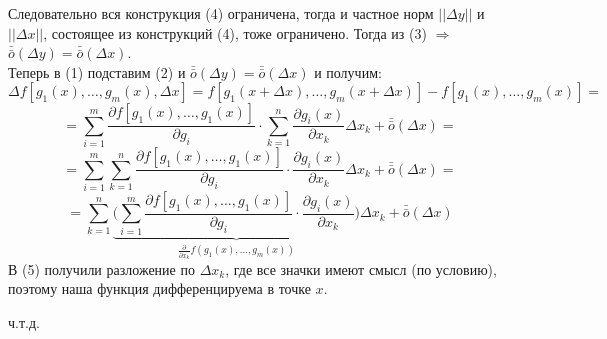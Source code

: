 \documentclass[book, 11pt]{report}
\begin{document}
{        Следовательно вся конструкция (4) ограничена, тогда и частное норм $||\Delta y||$ и $||\Delta x||$, состоящее из конструкций (4), тоже ограничено. Тогда из (3) $\Rightarrow$ $\bar{\bar{o}}(\Delta y)=\bar{\bar{o}}(\Delta x)$.\\
        Теперь в (1) подставим (2) и $\bar{\bar{o}}(\Delta y)=\bar{\bar{o}}(\Delta x)$ и получим:
        \begin{equation*}
            \Delta f[g_1(x),\ldots,g_m(x), \Delta x]=f[g_1(x+\Delta x),\ldots,g_m(x+\Delta x)]-f[g_1(x),\ldots,g_m(x)]=
        \end{equation*}
        \begin{equation*}
            =\sum_{i=1}^m\frac{\partial f[g_1(x),\ldots,g_1(x)]}{\partial g_i}\cdot\sum_{k=1}^n\frac{\partial g_i(x)}{\partial x_k}\Delta x_k+\bar{\bar{o}}(\Delta x)=
        \end{equation*}
        \begin{equation*}
            =\sum_{i=1}^m\sum_{k=1}^n\frac{\partial f[g_1(x),\ldots,g_1(x)]}{\partial g_i}\cdot\frac{\partial g_i(x)}{\partial x_k}\Delta x_k+\bar{\bar{o}}(\Delta x)=
        \end{equation*}
        \begin{equation}
            =\sum_{k=1}^n\underbrace{\Bigg(\sum_{i=1}^m\frac{\partial f[g_1(x),\ldots,g_1(x)]}{\partial g_i}\cdot\frac{\partial g_i(x)}{\partial x_k}\Bigg)}_{\frac{\partial}{\partial x_k}f(g_1(x),\ldots,g_m(x))}\Delta x_k+\bar{\bar{o}}(\Delta x)
        \end{equation}
        В (5) получили разложение по $\Delta x_k$, где все значки имеют смысл (по условию), поэтому наша функция дифференцируема в точке $x$.
        }
        \par{{\raggedleft ч.т.д.\par}}
        \newpage
        \setcounter{equation}{0}
\end{document}

